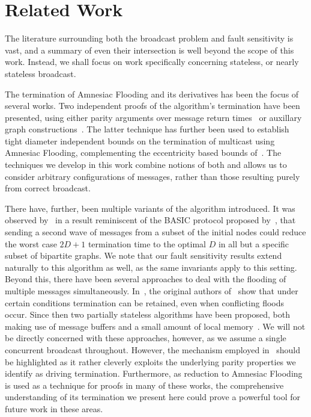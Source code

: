 \section{Related Work}
\label{sec: relatedwork}
The literature surrounding both the broadcast problem and fault sensitivity is vast, and a summary of even their intersection is well beyond the scope of this work. Instead, we shall focus on work specifically concerning stateless, or nearly stateless broadcast.

The termination of Amnesiac Flooding and its derivatives has been the focus of several works. Two independent proofs of the algorithm's termination have been presented, using either parity arguments over message return times~\cite{hussak2023termination} or auxillary graph constructions~\cite{turau2021amnesiac}. The latter technique has further been used to establish tight diameter independent bounds on the termination of multicast using Amnesiac Flooding, complementing the eccentricity based bounds of~\cite{hussak2023termination}. The techniques we develop in this work combine notions of both and allows us to consider arbitrary configurations of messages, rather than those resulting purely from correct broadcast. 

There have, further, been multiple variants of the algorithm introduced. It was observed by~\cite{turau2020stateless} in a result reminiscent of the BASIC protocol proposed by~\cite{gopal1999fast}, that sending a second wave of messages from a subset of the initial nodes could reduce the worst case $2D+1$ termination time to the optimal $D$ in all but a specific subset of bipartite graphs. We note that our fault sensitivity results extend naturally to this algorithm as well, as the same invariants apply to this setting. Beyond this, there have been several approaches to deal with the flooding of multiple messages simultaneously. In~\cite{HT-AFCases-Arxiv20}, the original authors of~\cite{hussak2023termination} show that under certain conditions termination can be retained, even when conflicting floods occur. Since then two partially stateless algorithms have been proposed, both making use of message buffers and a small amount of local memory~\cite{turau2021synchronous, bayramzadeh2021weak}. We will not be directly concerned with these approaches, however, as we assume a single concurrent broadcast throughout. However, the mechanism employed in~\cite{turau2021synchronous} should be highlighted as it rather cleverly exploits the underlying parity properties we identify as driving termination. Furthermore, as reduction to Amnesiac Flooding is used as a technique for proofs in many of these works, the comprehensive understanding of its termination we present here could prove a powerful tool for future work in these areas.

